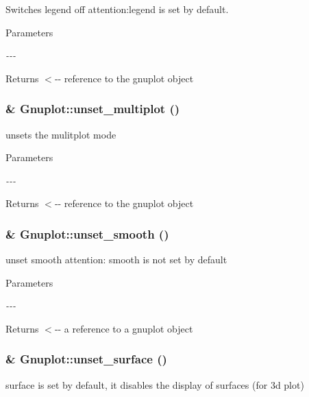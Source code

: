 Switches legend off attention:legend is set by default. 


\begin{DoxyParams}{Parameters}
\item[{\em -\/-\/-\/}]\end{DoxyParams}
\begin{DoxyReturn}{Returns}
$<$-\/-\/ reference to the gnuplot object 
\end{DoxyReturn}
\hypertarget{class_gnuplot_aad76cdec16cfb5fdf82f45ed2786f4d8}{
\subsubsection[{unset\_\-multiplot}]{\& Gnuplot::unset\_\-multiplot ()}}
\label{class_gnuplot_aad76cdec16cfb5fdf82f45ed2786f4d8}
unsets the mulitplot mode


\begin{DoxyParams}{Parameters}
\item[{\em -\/-\/-\/}]\end{DoxyParams}
\begin{DoxyReturn}{Returns}
$<$-\/-\/ reference to the gnuplot object 
\end{DoxyReturn}
\hypertarget{class_gnuplot_ad9dfbccd66dece1dbe5803605c6ab08c}{
\subsubsection[{unset\_\-smooth}]{\& Gnuplot::unset\_\-smooth ()}}
\label{class_gnuplot_ad9dfbccd66dece1dbe5803605c6ab08c}


unset smooth attention: smooth is not set by default 


\begin{DoxyParams}{Parameters}
\item[{\em -\/-\/-\/}]\end{DoxyParams}
\begin{DoxyReturn}{Returns}
$<$-\/-\/ a reference to a gnuplot object 
\end{DoxyReturn}
\hypertarget{class_gnuplot_a4ebddacbec61aa3e7bc4b89f508ad621}{
\subsubsection[{unset\_\-surface}]{\& Gnuplot::unset\_\-surface ()}}
\label{class_gnuplot_a4ebddacbec61aa3e7bc4b89f508ad621}
surface is set by default, it disables the display of surfaces (for 3d plot)


